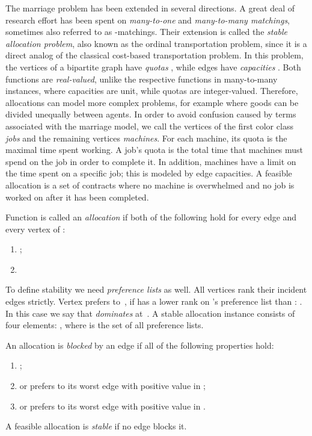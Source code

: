 \documentclass{llncs}
\begin{document}
The marriage problem has been extended in several directions. A great deal of research effort has been spent on \emph{many-to-one} and \emph{many-to-many matchings}, sometimes also referred to as -matchings. Their extension is called the \emph{stable allocation problem}, also known as the ordinal transportation problem, since it is a
direct analog of the classical cost-based transportation problem. In this problem, the vertices of a bipartite graph  have \emph{quotas} , while edges have \emph{capacities} . Both functions are \emph{real-valued}, unlike the respective functions in many-to-many instances, where capacities are unit, while quotas are integer-valued. Therefore, allocations can model more complex problems, for example where goods can be divided unequally between agents. In order to avoid confusion caused by terms associated with the marriage model, we call the vertices of the first color class \emph{jobs} and the remaining vertices \emph{machines}. For each machine, its quota is the maximal time spent working. A job's quota is the total time that machines must spend on the job in order to complete it. In addition, machines have a limit on the time spent on a specific job; this is modeled by edge capacities. A feasible allocation is a set of contracts where no machine is overwhelmed and no job is worked on after it has been completed.

\begin{definition} [allocation]
	Function  is called an \emph{allocation} if both of the following hold for every edge  and every vertex  of :
	\begin{enumerate}
		\item ;
		\item  {}
	\end{enumerate}
\end{definition}

To define stability we need \emph{preference lists} as well. All vertices rank their incident edges strictly. Vertex  prefers  to~, if  has a lower rank on 's preference list than : . In this case we say that  \emph{dominates}  at~. A stable allocation instance consists of four elements: , where  is the set of all preference lists.

\begin{definition}
\label{def_st_all}
	An allocation  is \emph{blocked} by an edge  if all of the following properties hold:
	\begin{enumerate}
		\item ;
		\item\label{j_dom}   or  prefers  to its worst edge with positive value in ;
		\item  or  prefers  to its worst edge with positive value in .
	\end{enumerate}
	A feasible allocation is \emph{stable} if no edge blocks it.
\end{definition}
\end{document}
